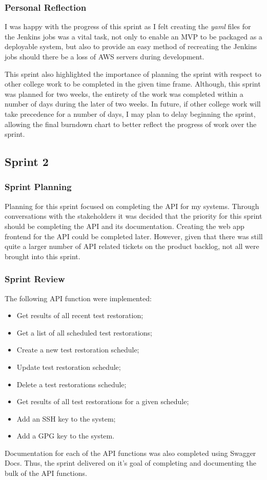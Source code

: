 		\subsubsection{Personal Reflection}
		I was happy with the progress of this sprint as I felt creating the \textit{yaml} files for the Jenkins jobs was a vital task, not only to enable an MVP to be packaged as a deployable system, but also to provide an easy method of recreating the Jenkins jobs should there be a loss of AWS servers during development.
		
		This sprint also highlighted the importance of planning the sprint with respect to other college work to be completed in the given time frame. Although, this sprint was planned for two weeks, the entirety of the work was completed within a number of days during the later of two weeks. In future, if other college work will take precedence for a number of days, I may plan to delay beginning the sprint, allowing the final burndown chart to better reflect the progress of work over the sprint.
    
  \subsection{Sprint 2}
  \subsubsection{Sprint Planning}
  Planning for this sprint focused on completing the API for my systems. Through conversations with the stakeholders it was decided that the priority for this sprint should be completing the API and its documentation. Creating the web app frontend for the API could be completed later. However, given that there was still quite a larger number of API related tickets on the product backlog, not all were brought into this sprint.
  
  \subsubsection{Sprint Review}
  The following API function were implemented:
  \begin{itemize}
    \item Get results of all recent test restoration;
    \item Get a list of all scheduled test restorations;
    \item Create a new test restoration schedule;
    \item Update test restoration schedule;
    \item Delete a test restorations schedule;
    \item Get results of all test restorations for a given schedule;
    \item Add an SSH key to the system;
    \item Add a GPG key to the system.
  \end{itemize}
  Documentation for each of the API functions was also completed using Swagger Docs. Thus, the sprint delivered on it's goal of completing and documenting the bulk of the API functions.
  
